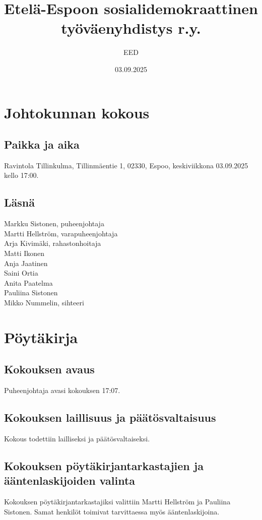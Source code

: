\documentclass[a4paper,12pt]{article}
\title{Etelä-Espoon sosialidemokraattinen työväenyhdistys r.y.}
\author{EED}
\date{03.09.2025}
\begin{document}
\maketitle
\tableofcontents
\section*{Johtokunnan kokous}
\subsection*{Paikka ja aika}
Ravintola Tillinkulma, Tillinmäentie 1, 02330, Espoo, keskiviikkona 03.09.2025 kello 17:00.
\subsection*{Läsnä}
Markku Sistonen, puheenjohtaja \\
Martti Hellström, varapuheenjohtaja \\
Arja Kivimäki, rahastonhoitaja \\
Matti Ikonen \\
Anja Jaatinen \\
Saini Ortia \\
Anita Paatelma \\
Pauliina Sistonen \\
Mikko Nummelin, sihteeri
\section*{Pöytäkirja}
\subsection{Kokouksen avaus}
Puheenjohtaja avasi kokouksen 17:07.
\subsection{Kokouksen laillisuus ja päätösvaltaisuus}
Kokous todettiin lailliseksi ja päätösvaltaiseksi.
\subsection{Kokouksen pöytäkirjantarkastajien ja ääntenlaskijoiden valinta}
Kokouksen pöytäkirjantarkastajiksi valittiin Martti Hellström ja Pauliina Sistonen. Samat henkilöt toimivat tarvittaessa myös ääntenlaskijoina.
\end{document}
